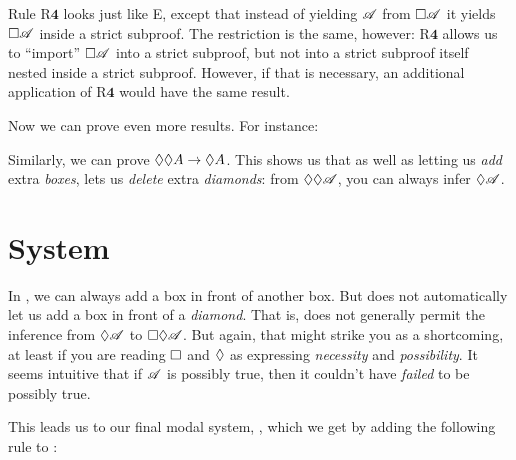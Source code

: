 Rule R$\mathbf{4}$ looks just like {\ebox}E, except that instead of yielding $\mathscr{A}$ from $\Box\mathscr{A}$ it yields $\Box\mathscr{A}$ inside a strict subproof. The restriction is the same, however: R$\mathbf{4}$ allows us to ``import'' $\Box \mathscr{A}$ into a strict subproof, but not into a strict subproof itself nested inside a strict subproof. However, if that is necessary, an additional application of R$\mathbf{4}$ would have the same result.

Now we can prove even more results. For instance:
\begin{fitchproof}
	\open
	\AS
	\open
	\AS
	\close
	\close
\end{fitchproof}
Similarly, we can prove $\Diamond\Diamond A \rightarrow \Diamond A$. This shows us that as well as letting us \emph{add} extra \emph{boxes}, \mlSfour{} lets us \emph{delete} extra \emph{diamonds}: from $\Diamond\Diamond \mathscr{A}$, you can always infer $\Diamond\mathscr{A}$.

\section{System \mlSfive}
\label{S5}

In \mlSfour, we can always add a box in front of another box. But \mlSfour{} does not automatically let us add a box in front of a \emph{diamond}. That is, \mlSfour{} does not generally permit the inference from $\Diamond\mathscr{A}$ to $\Box\Diamond\mathscr{A}$. But again, that might strike you as a shortcoming, at least if you are reading $\Box$ and $\Diamond$ as expressing \emph{necessity} and \emph{possibility}. It seems intuitive that if $\mathscr{A}$ is possibly true, then it couldn't have \emph{failed} to be possibly true.

This leads us to our final modal system, \mlSfive, which we get by adding the following rule to \mlSfour:

